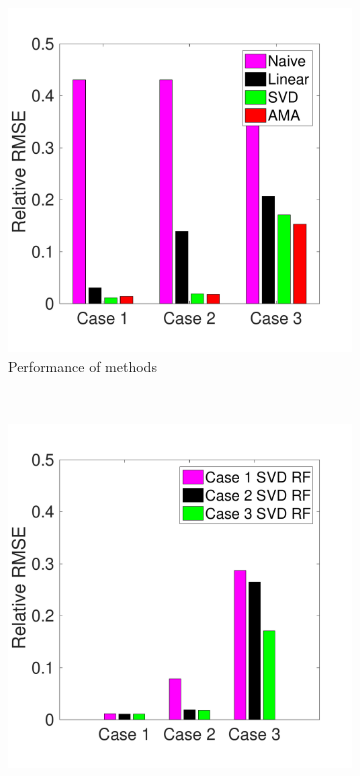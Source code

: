 \documentclass{jov}
\begin{document}
\begin{figure}
\centering
\begin{subfigure}[b]{0.3 \textwidth}
	\includegraphics[width=\textwidth]{../Figures/Figure8/Figure8_a.pdf}
	\caption{Performance of methods}
	\label{fig:summaryBarGraph}
    \end{subfigure}
    ~ %
    \begin{subfigure}[b]{0.3 \textwidth}   
	\includegraphics[width=\textwidth]{../Figures/Figure8/Figure8_b.pdf}

\end{subfigure}
\end{figure}
\end{document}
